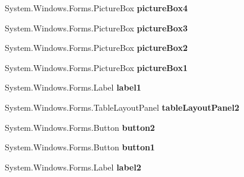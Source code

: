 \begin{DoxyCompactItemize}
\item 
\mbox{\label{class_reversi4color_form_1_1_reversi_a2ab9e683bef6375988a62fdb8d7e75ba}} 
System.\+Windows.\+Forms.\+Picture\+Box {\bfseries picture\+Box4}
\item 
\mbox{\label{class_reversi4color_form_1_1_reversi_a9deb5c7aaaaced1ac041abbf16fa6317}} 
System.\+Windows.\+Forms.\+Picture\+Box {\bfseries picture\+Box3}
\item 
\mbox{\label{class_reversi4color_form_1_1_reversi_ae103f1981d51b949f3dd1cb580893a80}} 
System.\+Windows.\+Forms.\+Picture\+Box {\bfseries picture\+Box2}
\item 
\mbox{\label{class_reversi4color_form_1_1_reversi_a7caf6180c2432b13de58c6ccf3002d3c}} 
System.\+Windows.\+Forms.\+Picture\+Box {\bfseries picture\+Box1}
\item 
\mbox{\label{class_reversi4color_form_1_1_reversi_acb54bc62b5f5b9d11b2a2c6a18baa9a9}} 
System.\+Windows.\+Forms.\+Label {\bfseries label1}
\item 
\mbox{\label{class_reversi4color_form_1_1_reversi_a1cbca12680076932b52e15be874c598d}} 
System.\+Windows.\+Forms.\+Table\+Layout\+Panel {\bfseries table\+Layout\+Panel2}
\item 
\mbox{\label{class_reversi4color_form_1_1_reversi_aae11716696adeb2f304848d6b64fa2f0}} 
System.\+Windows.\+Forms.\+Button {\bfseries button2}
\item 
\mbox{\label{class_reversi4color_form_1_1_reversi_a7b0701425388671f00727e6ee67f0c3e}} 
System.\+Windows.\+Forms.\+Button {\bfseries button1}
\item 
\mbox{\label{class_reversi4color_form_1_1_reversi_a9ef1cbe3343e31085331375bacf0a007}} 
System.\+Windows.\+Forms.\+Label {\bfseries label2}
\end{DoxyCompactItemize}
